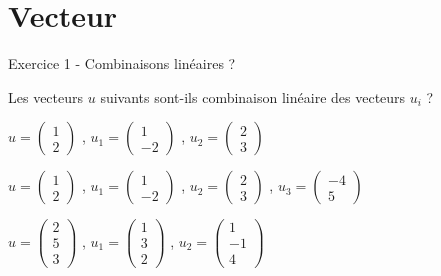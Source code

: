 \newpage
\section{Vecteur}
Exercice 1 - Combinaisons linéaires ?

\vspace{.323cm}
Les vecteurs $u$ suivants sont-ils combinaison linéaire des vecteurs $u_i$ ?

\vspace{.323cm}
$ u = 
\left( \begin{array}{ c }
 1 \\ 2
\end{array} \right)$
,
$ u_1 = 
\left( \begin{array}{ c }
 1 \\ −2
\end{array} \right)$
,
$ u_2 = 
\left( \begin{array}{ c }
 2 \\ 3
\end{array} \right)$

\vspace{.323cm}
$ u = 
\left( \begin{array}{ c }
 1 \\ 2
\end{array} \right)$
,
$ u_1 = 
\left( \begin{array}{ c }
 1 \\ −2
\end{array} \right)$
,
$ u_2 = 
\left( \begin{array}{ c }
 2 \\ 3
\end{array} \right)$
,
$ u_3 = 
\left( \begin{array}{ c }
 −4 \\ 5
\end{array} \right)$

\vspace{.323cm}
$ u = 
\left( \begin{array}{ c }
 2 \\ 5 \\ 3
\end{array} \right)$
,
$ u_1 = 
\left( \begin{array}{ c }
 1 \\ 3 \\ 2
\end{array} \right)$
,
$ u_2 = 
\left( \begin{array}{ c }
 1 \\ −1 \\ 4
\end{array} \right)$

